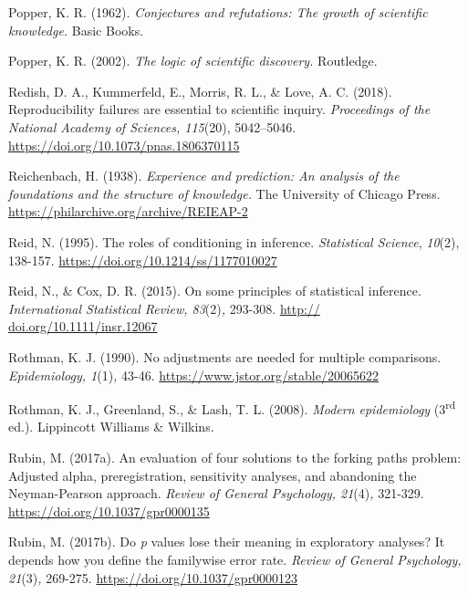 \documentclass[authordate, empirical]{jote-new-article}
\begin{document}
	Popper, K. R. (1962). \emph{Conjectures and refutations: The growth of scientific knowledge.} Basic Books.



	Popper, K. R. (2002). \emph{The logic of scientific discovery.} Routledge.



	Redish, D. A., Kummerfeld, E., Morris, R. L., \& Love, A. C. (2018). Reproducibility failures are essential to scientific inquiry. \emph{Proceedings of the National Academy of Sciences, 115}(20), 5042--5046. \href{https://doi.org/10.1073/pnas.1806370115}{https://doi.org/10.1073/pnas.1806370115}



	Reichenbach, H. (1938). \emph{Experience and prediction: An analysis of the foundations and the structure of knowledge.} The University of Chicago Press. \href{https://philarchive.org/archive/REIEAP-2}{https://philarchive.org/archive/REIEAP-2}



	Reid, N. (1995). The roles of conditioning in inference. \emph{Statistical Science}, \emph{10}(2), 138-157. \href{https://doi.org/10.1214/ss/1177010027}{https://doi.org/10.1214/ss/1177010027}



	Reid, N., \& Cox, D. R. (2015). On some principles of statistical inference. \emph{International Statistical Review, 83}(2)\emph{,} 293-308. \href{http://dx.doi.org/10.1111/insr.12067}{http:// doi.org/10.1111/insr.12067}



	Rothman, K. J. (1990). No adjustments are needed for multiple comparisons. \emph{Epidemiology, 1}(1)\emph{,} 43-46. \href{https://www.jstor.org/stable/20065622}{https://www.jstor.org/stable/20065622}



	Rothman, K. J., Greenland, S., \& Lash, T. L. (2008). \emph{Modern epidemiology} (3\textsuperscript{rd} ed.). Lippincott Williams \& Wilkins.



	Rubin, M. (2017a). An evaluation of four solutions to the forking paths problem: Adjusted alpha, preregistration, sensitivity analyses, and abandoning the Neyman-Pearson approach. \emph{Review of General Psychology, 21}(4)\emph{,} 321-329. \href{https://doi.org/10.1037/gpr0000135}{https://doi.org/10.1037/gpr0000135}



	Rubin, M. (2017b). Do \emph{p} values lose their meaning in exploratory analyses? It depends how you define the familywise error rate. \emph{Review of General Psychology, 21}(3)\emph{,} 269-275. \href{https://doi.org/10.1037/gpr0000123}{https://doi.org/10.1037/gpr0000123}
\end{document}
